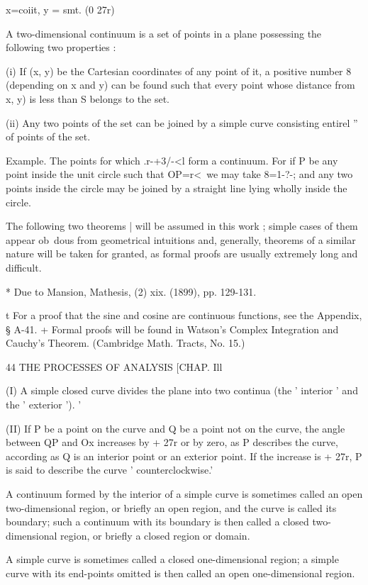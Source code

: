 x=coiit, y = smt. (0 27r)

A two-dimensional continuum is a set of points in a plane possessing
the following two properties :

(i) If (x, y) be the Cartesian coordinates of any point of it, a
positive number 8 (depending on x and y) can be found such that every
point whose distance from x, y) is less than S belongs to the set.

(ii) Any two points of the set can be joined by a simple curve
consisting entirel '' of points of the set.

Example. The points for which .r-+3/-<l form a continuum. For if P be
any point inside the unit circle such that OP=r<\, we may take 8=1-?-;
and any two points inside the circle may be joined by a straight line
lying wholly inside the circle.

The following two theorems | will be assumed in this work ; simple
cases of them appear ob\ dous from geometrical intuitions and,
generally, theorems of a similar nature will be taken for granted, as
formal proofs are usually extremely long and difficult.

* Due to Mansion, Mathesis, (2) xix. (1899), pp. 129-131.

t For a proof that the sine and cosine are continuous functions, see
the Appendix, § A-41. + Formal proofs will be found in Watson's
Complex Integration and Cauchy's Theorem. (Cambridge Math. Tracts, No.
15.)



44 THE PROCESSES OF ANALYSIS [CHAP. Ill

(I) A simple closed curve divides the plane into two continua (the '
interior ' and the ' exterior '). '

(II) If P be a point on the curve and Q be a point not on the curve,
the angle between QP and Ox increases by + 27r or by zero, as P
describes the curve, according as Q is an interior point or an
exterior point. If the increase is + 27r, P is said to describe the
curve ' counterclockwise.'

A continuum formed by the interior of a simple curve is sometimes
called an open two-dimensional region, or briefly an open region, and
the curve is called its boundary; such a continuum with its boundary
is then called a closed two-dimensional region, or briefly a closed
region or domain.

A simple curve is sometimes called a closed one-dimensional region; a
simple curve with its end-points omitted is then called an open
one-dimensional region.

